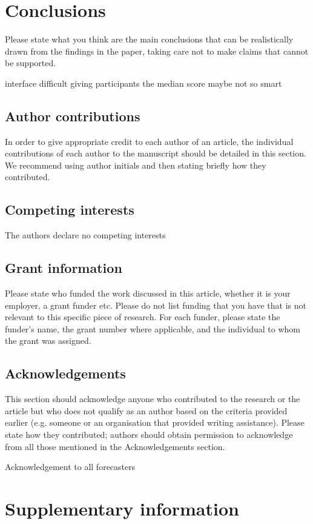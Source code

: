 \documentclass[10pt,a4paper,twocolumn]{article}
\begin{document}
\section*{Conclusions}
Please state what you think are the main conclusions that can be realistically drawn from the findings in the paper, taking care not to make claims that cannot be supported.

interface difficult
giving participants the median score maybe not so smart



\subsection*{Author contributions}
In order to give appropriate credit to each author of an article, the individual
contributions of each author to the manuscript should be detailed in this section. We
recommend using author initials and then stating briefly how they contributed.

\subsection*{Competing interests}
The authors declare no competing interests

\subsection*{Grant information}
Please state who funded the work discussed in this article, whether it is your employer,
a grant funder etc. Please do not list funding that you have that is not relevant to this
specific piece of research. For each funder, please state the funder’s name, the grant
number where applicable, and the individual to whom the grant was assigned.

\subsection*{Acknowledgements}
This section should acknowledge anyone who contributed to the research or the
article but who does not qualify as an author based on the criteria provided earlier
(e.g. someone or an organisation that provided writing assistance). Please state how
they contributed; authors should obtain permission to acknowledge from all those
mentioned in the Acknowledgements section.

Acknowledgement to all forecasters


\appendix
\section{Supplementary information}
\end{document}
